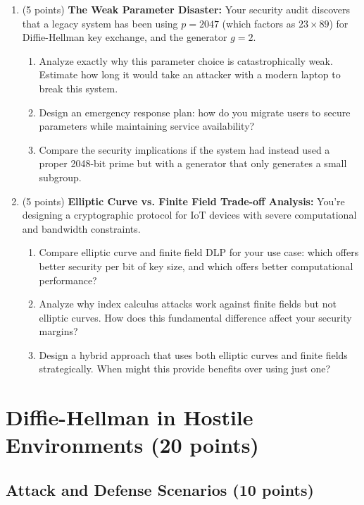 \documentclass[10pt,a4paper,american]{exam}
\begin{document}
\begin{enumerate}
	\item (5 points) \textbf{The Weak Parameter Disaster:}
	      Your security audit discovers that a legacy system has been using $p = 2047$ (which factors as $23 \times 89$) for Diffie-Hellman key exchange, and the generator $g = 2$.
	      \begin{enumerate}
		      \item Analyze exactly why this parameter choice is catastrophically weak. Estimate how long it would take an attacker with a modern laptop to break this system.
		      \item Design an emergency response plan: how do you migrate users to secure parameters while maintaining service availability?
		      \item Compare the security implications if the system had instead used a proper 2048-bit prime but with a generator that only generates a small subgroup.
	      \end{enumerate}
	\item (5 points) \textbf{Elliptic Curve vs. Finite Field Trade-off Analysis:}
	      You're designing a cryptographic protocol for IoT devices with severe computational and bandwidth constraints.
	      \begin{enumerate}
		      \item Compare elliptic curve and finite field DLP for your use case: which offers better security per bit of key size, and which offers better computational performance?
		      \item Analyze why index calculus attacks work against finite fields but not elliptic curves. How does this fundamental difference affect your security margins?
		      \item Design a hybrid approach that uses both elliptic curves and finite fields strategically. When might this provide benefits over using just one?
	      \end{enumerate}
\end{enumerate}

\section{Diffie-Hellman in Hostile Environments (20 points)}

\subsection{Attack and Defense Scenarios (10 points)}
\end{document}
